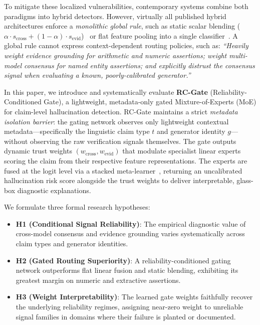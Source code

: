 \documentclass[pdflatex,sn-mathphys,Numbered]{sn-jnl}
\begin{document}
To mitigate these localized vulnerabilities, contemporary systems combine both paradigms into hybrid detectors. However, virtually all published hybrid architectures enforce a \emph{monolithic global rule}, such as static scalar blending ($\alpha \cdot s_{\mathrm{cross}} + (1-\alpha) \cdot s_{\mathrm{evid}}$)~\cite{ding2024rowen} or flat feature pooling into a single classifier~\cite{zhao2024medico}. A global rule cannot express context-dependent routing policies, such as: \emph{``Heavily weight evidence grounding for arithmetic and numeric assertions; weight multi-model consensus for named entity assertions; and explicitly distrust the consensus signal when evaluating a known, poorly-calibrated generator.''}

In this paper, we introduce and systematically evaluate \textbf{RC-Gate} (Reliability-Conditioned Gate), a lightweight, metadata-only gated Mixture-of-Experts (MoE) for claim-level hallucination detection. RC-Gate maintains a strict \emph{metadata isolation barrier}: the gating network observes only lightweight contextual metadata—specifically the linguistic claim type $t$ and generator identity $g$—without observing the raw verification signals themselves. The gate outputs dynamic trust weights $(w_{\mathrm{cross}}, w_{\mathrm{evid}})$ that modulate specialist linear experts scoring the claim from their respective feature representations. The experts are fused at the logit level via a stacked meta-learner~\cite{wolpert1992stacked}, returning an uncalibrated hallucination risk score alongside the trust weights to deliver interpretable, glass-box diagnostic explanations.

We formulate three formal research hypotheses:
\begin{itemize}
    \item \textbf{H1 (Conditional Signal Reliability)}: The empirical diagnostic value of cross-model consensus and evidence grounding varies systematically across claim types and generator identities.
    \item \textbf{H2 (Gated Routing Superiority)}: A reliability-conditioned gating network outperforms flat linear fusion and static blending, exhibiting its greatest margin on numeric and extractive assertions.
    \item \textbf{H3 (Weight Interpretability)}: The learned gate weights faithfully recover the underlying reliability regimes, assigning near-zero weight to unreliable signal families in domains where their failure is planted or documented.
\end{itemize}
\end{document}
